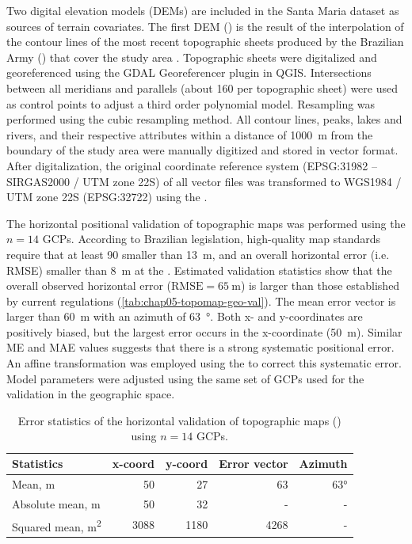 Two digital elevation models (DEMs) are included in the Santa Maria dataset as sources of terrain covariates. 
The first DEM (\demNew) is the result of the interpolation of the contour lines of the most recent topographic 
sheets produced by the Brazilian 
Army () that cover the study area \cite{DSG1980, DSG1992, DSG1992a}. Topographic sheets were 
digitalized
and georeferenced using the GDAL Georeferencer plugin in QGIS. Intersections between all meridians and 
parallels (about \num{160} per topographic sheet) were used as control points to adjust a third order 
polynomial 
model. Resampling was performed using the cubic resampling method. All contour lines, peaks, lakes and rivers, 
and their respective attributes within a distance of \SI{1000}{\metre} from the boundary of the study area 
were manually digitized and stored in vector format. After digitalization, the original coordinate 
reference system (EPSG:31982 -- SIRGAS2000 / UTM zone 22S) of all vector files was transformed to WGS1984 / 
UTM zone 22S (EPSG:32722) using the  \cite{BivandEtAl2013a}.

The horizontal positional validation of topographic maps was performed using the $n = 14$ GCPs. According to 
Brazilian 
legislation, high-quality map standards require that at least 90%
smaller than \SI{13}{\metre}, and an overall horizontal error (i.e. RMSE) smaller than \SI{8}{\metre} at the 
\cite{Brasil1984}. Estimated validation statistics show that the overall observed horizontal error 
($\text{RMSE} = \SI{65}{\m}$) 
is larger than those established by current regulations (\autoref{tab:chap05-topomap-geo-val}). The mean error 
vector is larger than \SI{60}{\metre} with an azimuth of \SI{63}{\degree}. Both x- and y-coordinates are 
positively biased, but the largest error occurs in the x-coordinate (\SI{50}{\metre}). Similar ME and MAE 
values suggests that there is a strong systematic positional error. An affine transformation was employed using 
the  \cite{Carrillo2012} to correct this systematic error. Model parameters were adjusted 
using the same set of GCPs used for the validation in the geographic space.

\begin{table}[ht]
 \caption[Error statistics of the horizontal validation of topographic maps.]{Error statistics of the 
horizontal validation of topographic maps () using $n = 14$  GCPs.}
 \label{tab:chap05-topomap-geo-val}
 \centering
 {\small
 \begin{tabular}{lrrrr}
  \hline
  Statistics                    & x-coord & y-coord & Error vector & Azimuth  \\
  \hline
  Mean, \si{\m}                 & 50      & 27      & 63           & \ang{63} \\ 
  Absolute mean, \si{\m}        & 50      & 32      & -            & -        \\ 
  Squared mean, \si{\m\squared} & 3088    & 1180    & 4268         & -        \\ 
  \hline
 \end{tabular}}
\end{table}

